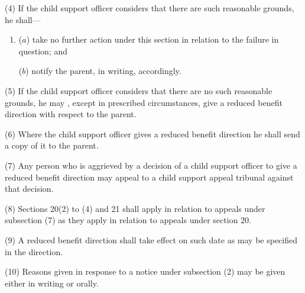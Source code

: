 \documentclass[12pt,a4paper]{article}
\begin{document}
(4) If 
the child support officer 
considers that there are such reasonable grounds, he shall—
\begin{enumerate}\item[]
($a$) take no further action under this section in relation to the failure in question; and

($b$) notify the parent, in writing, accordingly.
\end{enumerate}

(5) If 
the child support officer 
considers that there are no such reasonable grounds, he may%
, except in prescribed circumstances,  %
give a reduced benefit direction with respect to the parent.

(6) Where 
the child support officer 
gives a reduced benefit direction he shall send a copy of it to the parent.

(7) Any person who is aggrieved by a decision of a child support officer to give a reduced benefit direction may appeal to a child support appeal tribunal against that decision.

(8) Sections 20(2)  to (4)  and 21 shall apply in relation to appeals under subsection (7)  as they apply in relation to appeals under section 20.


(9) A reduced benefit direction shall take effect on such date as may be specified in the direction.

(10) Reasons given in response to a notice under subsection (2)  may be given either in writing or orally.
\end{document}
